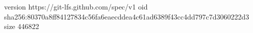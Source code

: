 version https://git-lfs.github.com/spec/v1
oid sha256:80370a8ff84127834c56fa6eaecddea4c61ad6389f43cc4dd797c7d3060222d3
size 446822
